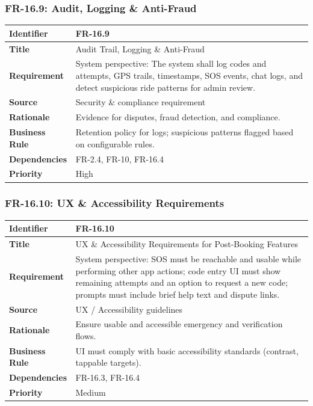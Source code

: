 \subsubsection{FR-16.9: Audit, Logging \& Anti-Fraud}

\begin{longtable}{|p{3cm}|p{12cm}|}
\hline
\rowcolor{lightgray!30}
\textbf{Identifier} & FR-16.9 \\
\hline
\textbf{Title} & Audit Trail, Logging \& Anti-Fraud \\
\hline
\textbf{Requirement} & System perspective: The system shall log codes and attempts, GPS trails, timestamps, SOS events, chat logs, and detect suspicious ride patterns for admin review. \\
\hline
\textbf{Source} & Security \& compliance requirement \\
\hline
\textbf{Rationale} & Evidence for disputes, fraud detection, and compliance. \\
\hline
\textbf{Business Rule} & Retention policy for logs; suspicious patterns flagged based on configurable rules. \\
\hline
\textbf{Dependencies} & FR-2.4, FR-10, FR-16.4 \\
\hline
\textbf{Priority} & High \\
\hline
\end{longtable}

\subsubsection{FR-16.10: UX \& Accessibility Requirements}

\begin{longtable}{|p{3cm}|p{12cm}|}
\hline
\rowcolor{lightgray!30}
\textbf{Identifier} & FR-16.10 \\
\hline
\textbf{Title} & UX \& Accessibility Requirements for Post-Booking Features \\
\hline
\textbf{Requirement} & System perspective: SOS must be reachable and usable while performing other app actions; code entry UI must show remaining attempts and an option to request a new code; prompts must include brief help text and dispute links. \\
\hline
\textbf{Source} & UX / Accessibility guidelines \\
\hline
\textbf{Rationale} & Ensure usable and accessible emergency and verification flows. \\
\hline
\textbf{Business Rule} & UI must comply with basic accessibility standards (contrast, tappable targets). \\
\hline
\textbf{Dependencies} & FR-16.3, FR-16.4 \\
\hline
\textbf{Priority} & Medium \\
\hline
\end{longtable}

